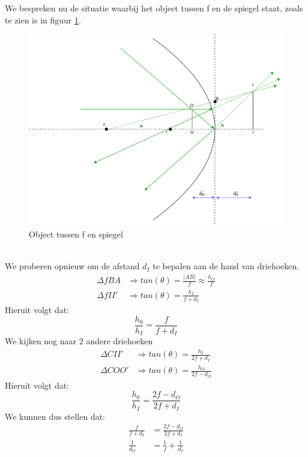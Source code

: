 \documentclass[a4paper,kul]{kulakarticle} %
\begin{document}
\newpage
We bespreken nu de situatie waarbij het object tussen f en de spiegel staat, zoals te zien is in figuur \ref{fig:objectspiegelf}.
\begin{figure}[h]
	\centering
	\includegraphics[width=0.7\linewidth]{ObjectSpiegelF}
	\caption[Object tussen f en spiegel]{Object tussen f en spiegel}
	\label{fig:objectspiegelf}
\end{figure}\\
We proberen opnieuw om de afstand $d_I$ te bepalen aan de hand van driehoeken.
\begin{align*}
	\Delta fBA&\Rightarrow tan(\theta)=\frac{|AB|}{f}\approx\frac{h_O}{f}\\
	\Delta fII'&\Rightarrow tan(\theta)= \frac{h_I}{f+d_I}
\end{align*}
Hieruit volgt dat:
\begin{equation*}
	\frac{h_0}{h_I}=\frac{f}{f+d_I}
\end{equation*}
We kijken nog naar 2 andere driehoeken
\begin{align*}
	\Delta CII'&\Rightarrow tan(\theta)= \frac{h_I}{2f+d_I}\\
	\Delta COO'&\Rightarrow tan(\theta)= \frac{h_O}{2f-d_O}
\end{align*}
Hieruit volgt dat:
\begin{equation*}
	\frac{h_0}{h_I}=\frac{2f-d_O}{2f+d_I}
\end{equation*}
We kunnen dus stellen dat:
\begin{align*}
	\frac{f}{f+d_I}&=\frac{2f-d_O}{2f+d_I}\\
	\frac{1}{d_O} &= \frac{1}{f}+\frac{1}{d_I}
\end{align*}
\end{document}
